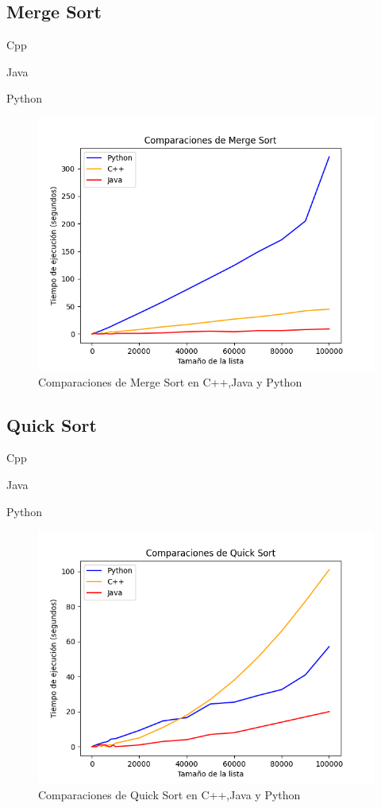 \subsection{Merge Sort} 
Cpp

Java

Python


\begin{figure}[h]
    \centering
    \includegraphics[scale=.60]{img/merge sort.png}
    \caption{Comparaciones de Merge Sort en C++,Java y Python}
    \label{fig:primera_figura}
\end{figure}

\vspace{2cm}
\subsection{Quick Sort} 
Cpp

Java

Python


\begin{figure}[h]
    \centering
    \includegraphics[scale=.60]{img/quick sort.png}
    \caption{Comparaciones de Quick Sort en C++,Java y Python}
    \label{fig:primera_figura}
\end{figure}

